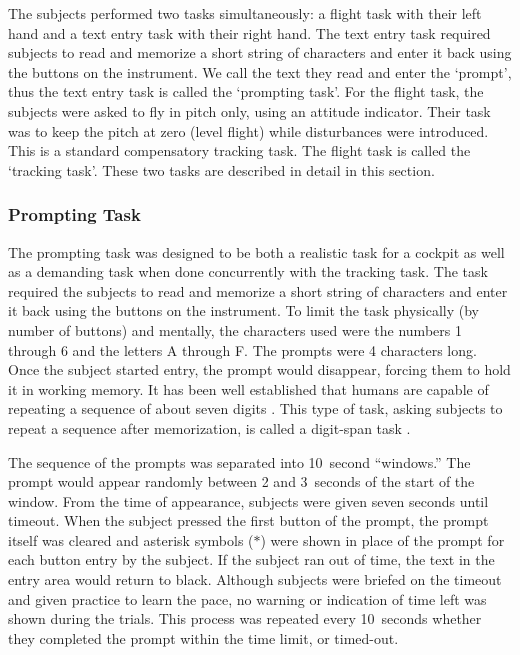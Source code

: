 The subjects performed two tasks simultaneously: a flight task with their left hand and a text entry task with their right hand.
The text entry task required subjects to read and memorize a short string of characters and enter it back using the buttons on the instrument.
We call the text they read and enter the `prompt', thus the text entry task is called the `prompting task'.
For the flight task, the subjects were asked to fly in pitch only, using an attitude indicator.
Their task was to keep the pitch at zero (level flight) while disturbances were introduced.
This is a standard compensatory tracking task.
The flight task is called the `tracking task'.
These two tasks are described in detail in this section.

\subsubsection{Prompting Task}

The prompting task was designed to be both a realistic task for a cockpit as well as a demanding task when done concurrently with the tracking task.
The task required the subjects to read and memorize a short string of characters and enter it back using the buttons on the instrument.
To limit the task physically (by number of buttons) and mentally, the characters used were the numbers 1 through 6 and the letters A through F.
The prompts were 4 characters long.
Once the subject started entry, the prompt would disappear, forcing them to hold it in working memory.
It has been well established that humans are capable of repeating a sequence of about seven digits \citep{miller_magical_1956}.
This type of task, asking subjects to repeat a sequence after memorization, is called a digit-span task \citep{baddeley_working_1992}.

The sequence of the prompts was separated into 10~second ``windows.''
The prompt would appear randomly between 2 and 3~seconds of the start of the window.
From the time of appearance, subjects were given seven seconds until timeout.
When the subject pressed the first button of the prompt, the prompt itself was cleared and asterisk symbols ($*$) were shown in place of the prompt for each button entry by the subject.
If the subject ran out of time, the text in the entry area would return to black.
Although subjects were briefed on the timeout and given practice to learn the pace, no warning or indication of time left was shown during the trials.
This process was repeated every 10~seconds whether they completed the prompt within the time limit, or timed-out.

